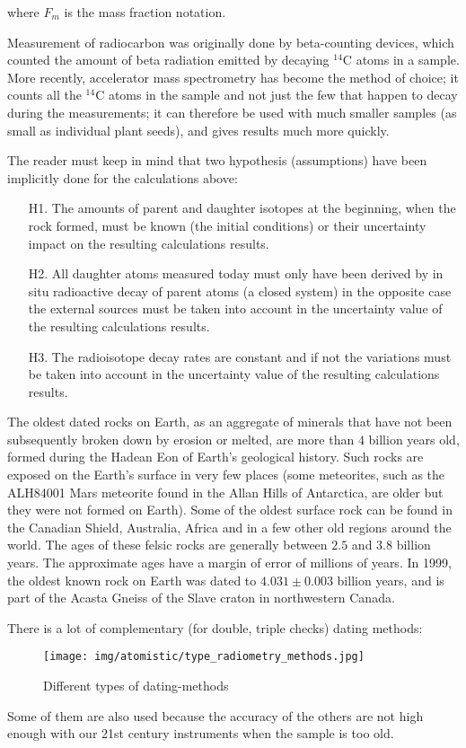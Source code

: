 	where $F_m$ is the mass fraction notation.
	
	\begin{tcolorbox}[title=Remark,colframe=black,arc=10pt]
	Measurement of radiocarbon was originally done by beta-counting devices, which counted the amount of beta radiation emitted by decaying $^{14}\mathrm{C}$ atoms in a sample. More recently, accelerator mass spectrometry has become the method of choice; it counts all the $^{14}\mathrm{C}$ atoms in the sample and not just the few that happen to decay during the measurements; it can therefore be used with much smaller samples (as small as individual plant seeds), and gives results much more quickly.
	\end{tcolorbox}
	The reader must keep in mind that two hypothesis (assumptions) have been implicitly done for the calculations above:
	\begin{enumerate}
		\item[H1.] The amounts of parent and daughter isotopes at the beginning, when the rock formed, must be known (the initial conditions) or their uncertainty impact on the resulting calculations results.

		\item[H2.] All daughter atoms measured today must only have been derived by in situ radioactive decay of parent atoms (a closed system) in the opposite case the external sources must be taken into account in the uncertainty value of the resulting calculations results.
		
		\item[H3.] The radioisotope decay rates are constant and if not the variations must be taken into account in the uncertainty value of the resulting calculations results.
	\end{enumerate}
	\begin{tcolorbox}[title=Remark,colframe=black,arc=10pt]
	The oldest dated rocks on Earth, as an aggregate of minerals that have not been subsequently broken down by erosion or melted, are more than $4$ billion years old, formed during the Hadean Eon of Earth's geological history. Such rocks are exposed on the Earth's surface in very few places (some meteorites, such as the ALH84001 Mars meteorite found in the Allan Hills of Antarctica, are older but they were not formed on Earth). Some of the oldest surface rock can be found in the Canadian Shield, Australia, Africa and in a few other old regions around the world. The ages of these felsic rocks are generally between $2.5$ and $3.8$ billion years. The approximate ages have a margin of error of millions of years. In 1999, the oldest known rock on Earth was dated to $4.031 \pm 0.003$ billion years, and is part of the Acasta Gneiss of the Slave craton in northwestern Canada.
	\end{tcolorbox}	
	There is a lot of complementary (for double, triple checks) dating methods:
	\begin{figure}[H]
		\centering
		\texttt{[image: img/atomistic/type\_radiometry\_methods.jpg]}	
		\caption{Different types of dating-methods}
	\end{figure}
	Some of them are also used because the accuracy of the others are not high enough with our 21st century instruments when the sample is too old.
	
